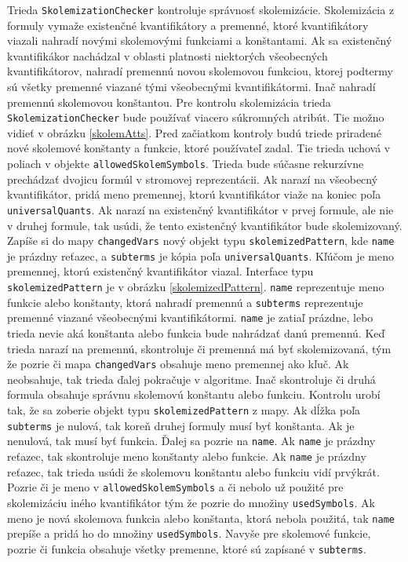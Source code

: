 Trieda \texttt{SkolemizationChecker} kontroluje správnosť skolemizácie. Skolemizácia z formuly vymaže existenčné kvantifikátory a premenné, ktoré kvantifikátory viazali nahradí novými skolemovými funkciami a konštantami. Ak sa existenčný kvantifikákor nachádzal v oblasti platnosti niektorých všeobecných kvantifikátorov, nahradí premennú novou skolemovou funkciou, ktorej podtermy sú všetky premenné viazané tými všeobecnými kvantifikátormi. Inač nahradí premennú skolemovou konštantou. Pre kontrolu skolemizácia trieda \texttt{SkolemizationChecker} bude používať viacero súkromných atribút. Tie možno vidieť v obrázku \eqref{skolemAtts}. 
Pred začiatkom kontroly budú triede priradené nové skolemové konštanty a funkcie, ktoré používateľ zadal. Tie trieda uchová v poliach v objekte \texttt{allowedSkolemSymbols}. Trieda bude súčasne rekurzívne prechádzať dvojicu formúl v stromovej reprezentácii. Ak narazí na všeobecný kvantifikátor, pridá meno premennej, ktorú kvantifikátor viaže na koniec poľa \texttt{universalQuants}. Ak narazí na existenčný kvantifikátor v prvej formule, ale nie v druhej formule, tak usúdi, že tento existenčný kvantifikátor bude skolemizovaný. Zapíše si do mapy \texttt{changedVars} nový objekt typu \texttt{skolemizedPattern}, kde \texttt{name} je prázdny reťazec, a \texttt{subterms} je kópia poľa \texttt{universalQuants}. Kľúčom je meno premennej, ktorú existenčný kvantifikátor viazal. Interface typu \texttt{skolemizedPattern} je v obrázku \eqref{skolemizedPattern}. \texttt{name} reprezentuje meno funkcie alebo konštanty, ktorá nahradí premennú a \texttt{subterms} reprezentuje premenné viazané všeobecnými kvantifikátormi. \texttt{name} je zatiaľ prázdne, lebo trieda nevie aká konštanta alebo funkcia bude nahrádzať danú premennú. Keď trieda narazí na premennú, skontroluje či premenná má byť skolemizovaná, tým že pozrie či mapa \texttt{changedVars} obsahuje meno premennej ako kľuč. Ak neobsahuje, tak trieda ďalej pokračuje v algoritme. Inač skontroluje či druhá formula obsahuje správnu skolemovú konštantu alebo funkciu. 
Kontrolu urobí tak, že sa zoberie objekt typu \texttt{skolemizedPattern} z mapy. Ak dĺžka poľa \texttt{subterms} je nulová, tak koreň druhej formuly musí byť konštanta. Ak je nenulová, tak musí byť funkcia. Ďalej sa pozrie na \texttt{name}. Ak \texttt{name} je prázdny reťazec, tak skontroluje meno konštanty alebo funkcie. Ak \texttt{name} je prázdny reťazec, tak trieda usúdi že skolemovu konštantu alebo funkciu vidí prvýkrát. Pozrie či je meno v \texttt{allowedSkolemSymbols} a či nebolo už použité pre skolemizáciu iného kvantifikátor tým že pozrie do množiny \texttt{usedSymbols}. Ak meno je nová skolemova funkcia alebo konštanta, ktorá nebola použitá, tak \texttt{name} prepíše a pridá ho do množiny \texttt{usedSymbols}. Navyše pre skolemové funkcie, pozrie či funkcia obsahuje všetky premenne, ktoré sú zapísané v \texttt{subterms}.

